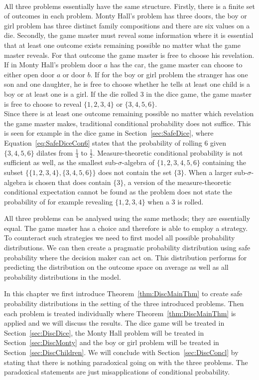 \documentclass[a4paper]{report}
\theoremstyle{plain}
\theoremstyle{definition}
\theoremstyle{remark}
\numberwithin{equation}{chapter}
\DeclareMathOperator{\1}{\mathbbm{1}}
\begin{document}
\paragraph{}
All three problems essentially have the same structure. Firstly, there is a finite set of outcomes in each problem. Monty Hall's problem has three doors, the boy or girl problem has three distinct family compositions and there are six values on a die. Secondly, the game master must reveal some information where it is essential that at least one outcome exists remaining possible no matter what the game master reveals. For that outcome the game master is free to choose his revelation. If in Monty Hall's problem door $a$ has the car, the game master can choose to either open door $a$ or door $b$. If for the boy or girl problem the stranger has one son and one daughter, he is free to choose whether he tells at least one child is a boy or at least one is a girl. If the die rolled 3 in the dice game, the game master is free to choose to reveal $\{1,2,3,4\}$ or $\{3,4,5,6\}$.\\
Since there is at least one outcome remaining possible no matter which revelation the game master makes, traditional conditional probability does not suffice. This is seen for example in the dice game in Section~\ref{sec:SafeDice}, where Equation~\ref{eq:SafeDiceCon6} states that the probability of rolling $6$ given $\{3,4,5,6\}$ dilates from $\frac{1}{4}$ to $\frac{1}{2}$. Measure-theoretic conditional probability is not sufficient as well, as the smallest sub-$\sigma$-algebra of $\{1,2,3,4,5,6\}$ containing the subset $\{\{1,2,3,4\},\{3,4,5,6\}\}$ does not contain the set $\{3\}$. When a larger sub-$\sigma$-algebra is chosen that does contain $\{3\}$, a version of the measure-theoretic conditional expectation cannot be found as the problem does not state the probability of for example revealing $\{1,2,3,4\}$ when a $3$ is rolled.

All three problems can be analysed using the same methods; they are essentially equal. The game master has a choice and therefore is able to employ a strategy. To counteract such strategies we need to first model all possible probability distributions. We can then create a pragmatic probability distribution using safe probability where the decision maker can act on. This distribution performs for predicting the distribution on the outcome space on average as well as all probability distributions in the model.

In this chapter we first introduce Theorem~\ref{thm:DiscMainThm} to create safe probability distributions in the setting of the three introduced problems. Then each problem is treated individually where Theorem~\ref{thm:DiscMainThm} is applied and we will discuss the results. The dice game will be treated in Section~\ref{sec:DiscDice}, the Monty Hall problem will be treated in Section~\ref{sec:DiscMonty} and the boy or girl problem will be treated in Section~\ref{sec:DiscChildren}. We will conclude with Section~\ref{sec:DiscConcl} by stating that there is nothing paradoxical going on with the three problems. The paradoxical statements are just misapplications of conditional probability.
\end{document}
